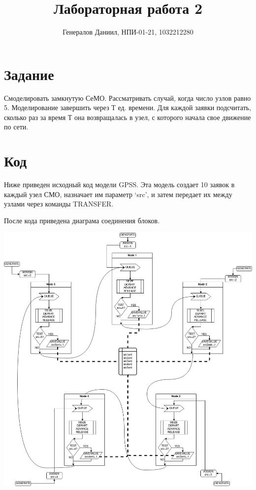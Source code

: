\documentclass{article}
\title{Лабораторная работа 2}
\author{Генералов Даниил, НПИ-01-21, 1032212280}
\begin{document}
\maketitle

\section{Задание}
Смоделировать замкнутую СеМО. Рассматривать случай, когда число узлов равно 5.
Моделирование завершить через $Т$ ед. времени. Для каждой заявки подсчитать, сколько
раз за время $Т$ она возвращалась в узел, с которого начала свое движение по сети.

\section{Код}

Ниже приведен исходный код модели GPSS. 
Эта модель создает 10 заявок в каждый узел СМО,
назначает им параметр `src', 
и затем передает их между узлами через команды TRANSFER.

После кода приведена диаграма соединения блоков.




\includegraphics[width=\textwidth]{dia}
\end{document}
